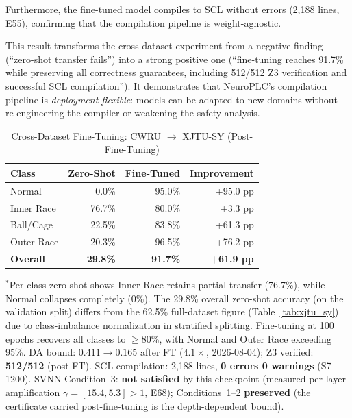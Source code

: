 \documentclass[journal,onecolumn]{IEEEtran}
\begin{document}
Furthermore, the fine-tuned model compiles to SCL without errors
(2,188 lines, E55), confirming that the compilation pipeline is
weight-agnostic.

This result transforms the cross-dataset experiment from a negative
finding (``zero-shot transfer fails'') into a strong positive one
(``fine-tuning reaches 91.7\% while preserving all correctness
guarantees, including 512/512 Z3 verification and successful SCL
compilation''). It demonstrates that NeuroPLC's compilation pipeline
is \textit{deployment-flexible}: models can be adapted to new domains
without re-engineering the compiler or weakening the safety analysis.

\begin{table}[t]
\centering
\caption{Cross-Dataset Fine-Tuning: CWRU $\to$ XJTU-SY (Post-Fine-Tuning)}
\label{tab:xjtu_ft}
\footnotesize
\begin{tabular}{@{}lrrr@{}}
\toprule
\textbf{Class} & \textbf{Zero-Shot} & \textbf{Fine-Tuned} & \textbf{Improvement} \\
\midrule
Normal       & 0.0\%  & 95.0\% & +95.0 pp \\
Inner Race   & 76.7\% & 80.0\% & +3.3 pp \\
Ball/Cage    & 22.5\% & 83.8\% & +61.3 pp \\
Outer Race   & 20.3\% & 96.5\% & +76.2 pp \\
\midrule
\textbf{Overall} & \textbf{29.8\%} & \textbf{91.7\%} & \textbf{+61.9 pp} \\
\midrule
\bottomrule
\end{tabular}
\vspace{2pt}
{\scriptsize $^{*}$Per-class zero-shot shows Inner Race retains partial transfer (76.7\%), while Normal collapses completely (0\%). The 29.8\% overall zero-shot accuracy (on the validation split) differs from the 62.5\% full-dataset figure (Table~\ref{tab:xjtu_sy}) due to class-imbalance normalization in stratified splitting. Fine-tuning at 100 epochs recovers all classes to $\geq$80\%, with Normal and Outer Race exceeding 95\%. DA bound: $0.411 \to 0.165$ after FT ($4.1\times$, 2026-08-04); Z3 verified: \textbf{512/512} (post-FT). SCL compilation: 2,188 lines, \textbf{0 errors 0 warnings} (S7-1200). SVNN Condition~3: \textbf{not satisfied} by this checkpoint (measured per-layer amplification $\gamma = [15.4, 5.3] > 1$, E68); Conditions~1--2 \textbf{preserved} (the certificate carried post-fine-tuning is the depth-dependent bound).}
\end{table}
\end{document}
